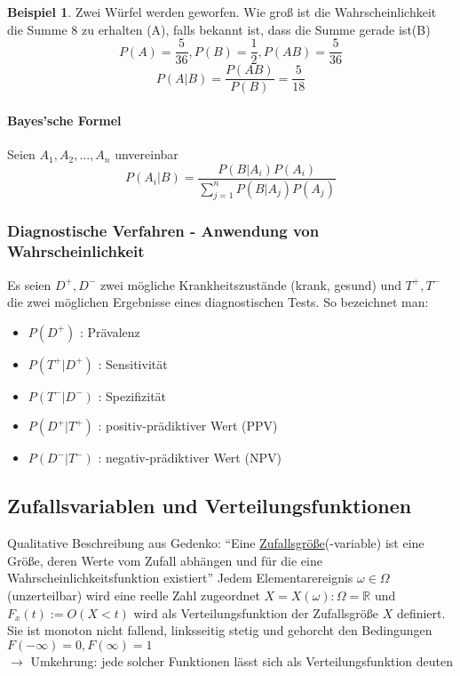 \documentclass[10pt,a4paper]{article}
\theoremstyle{definition}
\newtheorem{exmp}{Beispiel}
\begin{document}
\begin{exmp}
	Zwei Würfel werden geworfen. Wie groß ist die Wahrscheinlichkeit die Summe 8 zu erhalten (A), falls bekannt ist, dass die Summe gerade ist(B)\\
	\[ P(A)=\frac{5}{36}, P(B)=\frac{1}{2}, P(AB)=\frac{5}{36} \]
	\[ P(A|B)=\frac{P(AB)}{P(B)}=\frac{5}{18} \]
\end{exmp}


\paragraph{Bayes'sche Formel} 
Seien $A_1,A_2,...,A_n$ unvereinbar 
\[ P(A_i|B)=\frac{P(B|A_i) P(A_i)}{\sum\limits_{j=1}^n P(B|A_j) P(A_j)} \]

\subsubsection{Diagnostische Verfahren - Anwendung von Wahrscheinlichkeit}
Es seien $D^+, D^-$ zwei mögliche Krankheitszustände (krank, gesund) und $T^+,T^-$ die zwei möglichen Ergebnisse eines diagnostischen Tests.
So bezeichnet man:
\begin{itemize}
 \item $P(D^+)$ : Prävalenz
 \item $P(T^+|D^+)$ : Sensitivität
 \item $P(T^-|D^-)$ : Spezifizität
 \item $P(D^+|T^+)$ : positiv-prädiktiver Wert (PPV)
 \item $P(D^-|T^-)$ : negativ-prädiktiver Wert (NPV)
\end{itemize}

\subsection{Zufallsvariablen und Verteilungsfunktionen}
Qualitative Beschreibung aus Gedenko: ``Eine \underline{Zufallsgröße}(-variable) ist eine Größe, deren Werte vom Zufall abhängen und für die eine Wahrscheinlichkeitsfunktion existiert''
Jedem Elementarereignis $\omega \in \Omega$ (unzerteilbar) wird eine reelle Zahl zugeordnet $X=X(\omega) : \Omega = \mathbb{R}$ und $F_x(t):=O(X<t)$ wird als Verteilungsfunktion der Zufallsgröße $X$ definiert. Sie ist monoton nicht fallend, linksseitig stetig und gehorcht den Bedingungen $F(-\infty)=0,F(\infty)=1$ \\
$\rightarrow$ Umkehrung: jede solcher Funktionen lässt sich als Verteilungsfunktion deuten
\end{document}
